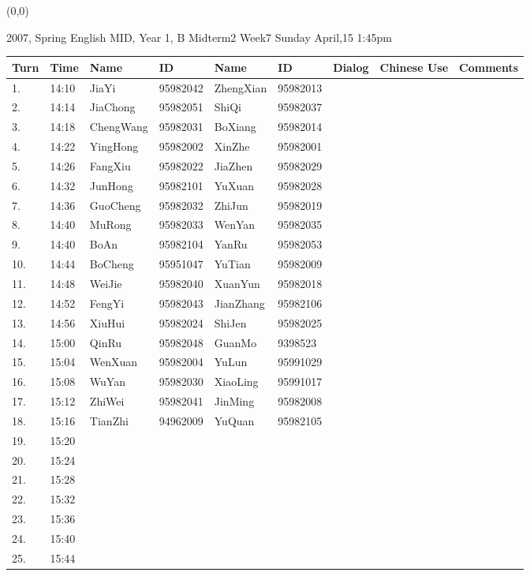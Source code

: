 \documentclass[a4paper]{article}
\begin{document}
\begin{textblock}{15}(0,0)
\begin{minipage}{20cm}
\Large
\begin{Large}2007, Spring English MID, Year 1, B Midterm2 Week7 Sunday April,15 1:45pm\end{Large}
\par
\begin{tabular}[t]{|p{0.5cm}|p{0.8cm}|p{2.1cm}|p{2.1cm}|p{2.1cm}|p{2.1cm}|p{0.9cm}|p{3.0cm}|p{2.5cm}|}
\hline
 Turn & Time & Name & ID & Name & ID & Dialog & Chinese Use & Comments \\ \hline
\hline

1. &14:10& JiaYi	&95982042& ZhengXian &95982013& & & \\ \hline
2. &14:14& JiaChong	&95982051& ShiQi	&95982037& & & \\ \hline
3. &14:18& ChengWang	&95982031& BoXiang	&95982014& & & \\ \hline
4. &14:22& YingHong	&95982002& XinZhe	&95982001& & & \\ \hline
5. &14:26& FangXiu	&95982022& JiaZhen	&95982029& & & \\ \hline
6. &14:32& JunHong	&95982101& YuXuan	&95982028& & & \\ \hline
7. &14:36& GuoCheng	&95982032& ZhiJun	&95982019& & & \\ \hline
8. &14:40& MuRong	&95982033& WenYan	&95982035& & & \\ \hline
9. &14:40& BoAn	&95982104& YanRu	&95982053& & & \\ \hline
10.&14:44& BoCheng	&95951047& YuTian	&95982009& & & \\ \hline
11.&14:48& WeiJie	&95982040& XuanYun	&95982018& & & \\ \hline
12.&14:52& FengYi	&95982043& JianZhang	&95982106& & & \\ \hline
13.&14:56& XiuHui	&95982024& ShiJen	&95982025& & & \\ \hline
14.&15:00& QinRu	&95982048& GuanMo	&9398523& & & \\ \hline
15.&15:04& WenXuan	&95982004& YuLun	&95991029& & & \\ \hline
16.&15:08& WuYan	&95982030& XiaoLing	&95991017& & & \\ \hline
17.&15:12& ZhiWei	&95982041& JinMing	&95982008& & & \\ \hline
18.&15:16& TianZhi	&94962009& YuQuan	&95982105& & & \\ \hline
19.&15:20& && && & & \\ \hline
20.&15:24& && && & & \\ \hline
21.&15:28& && && & & \\ \hline
22.&15:32& && && & & \\ \hline
23.&15:36& && && & & \\ \hline
24.&15:40& && && & & \\ \hline
25.&15:44& && && & & \\ \hline
\hline
\end{tabular}
\end{minipage}
\end{textblock}
\end{document}
